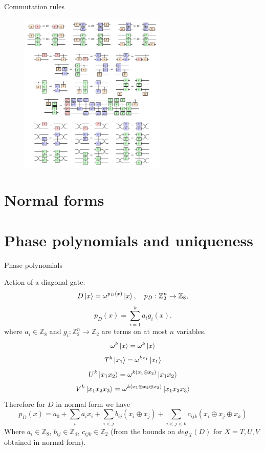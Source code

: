 \documentclass{beamer}
\theoremstyle{definition}
\begin{document}
\begin{frame}{Commutation rules}

\begin{figure}
\includegraphics[width=7cm]{commutation-rules}
\centering
\end{figure}
\end{frame}

\section{Normal forms}

\section{Phase polynomials and uniqueness}

\begin{frame}{Phase polynomials}

Action of a diagonal gate:
$$ D \ket{x} = \omega^{p_D(x)}\ket{x}, \quad p_D: \mathbb{Z}_2^n \rightarrow \mathbb{Z}_8 ,$$
$$ p_D(x) = \sum_{i=1}^k a_i g_i(x) .$$
where $a_i \in \mathbb{Z}_8$ and $g_i:\mathbb{Z}_2^n \rightarrow \mathbb{Z}_2$ are terms on at most $n$ variables.
$$ \omega^k \ket{x} = \omega^k \ket{x} $$
$$ T^k \ket{x_1} = \omega^{kx_1}\ket{x_1}$$
$$ U^k \ket{x_1x_2} = \omega^{k(x_1\oplus x_2)}\ket{x_1x_2}$$
$$ V^k \ket{x_1x_2x_3} = \omega^{k(x_1\oplus x_2 \oplus x_3)}\ket{x_1x_2x_3}$$
Therefore for $D$ in normal form we have
$$ p_D(x) = a_0 + \sum_i a_i x_i + \sum_{i<j}b_{ij} (x_i \oplus x_j) + \sum_{i<j<k}c_{ijk} (x_i \oplus x_j \oplus x_k)$$
Where $a_i \in \mathbb{Z}_8$, $b_{ij} \in \mathbb{Z}_4$, $c_{ijk} \in \mathbb{Z}_2$ (from the bounds on $deg_X(D)$ for $X=T,U,V$ obtained in normal form).

\end{frame}
\end{document}

